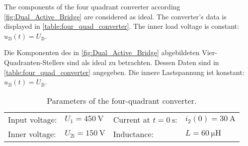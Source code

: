 




The components of the four quadrant converter according \autoref{fig:Dual_Active_Bridge} are considered as ideal.
The converter's data is displayed in \autoref{table:four_quad_converter}. The inner load voltage is constant: $u_{2\mathrm{i}}(t)=U_{2\mathrm{i}}$.

\begin{germanblock}
Die Komponenten des in \autoref{fig:Dual_Active_Bridge} abgebildeten Vier-Quadranten-Stellers sind als ideal zu betrachten. Dessen Daten sind 
in \autoref{table:four_quad_converter} angegeben. Die innere Lastspannung ist konstant: $u_{2\mathrm{i}}(t)=U_{2\mathrm{i}}$.
\end{germanblock}



\begin{table}[ht]
    \centering  %
    \begin{tabular}{llll}
        \toprule
        Input voltage: &  $U_{\mathrm{1}} = \SI{450}{\volt}$ & Current at $t=\SI{0}{\second}$: & $i_{\mathrm{2}}(0) = \SI{30}{\ampere}$ \\ 
        Inner voltage: & $U_{\mathrm{2i}} = \SI{150}{\volt}$  & Inductance: & $L = \SI{60}{\micro\henry}$ \\ 
        \bottomrule
    \end{tabular}
    \caption{Parameters of the four-quadrant converter.}  %
    \label{table:four_quad_converter}
\end{table}

